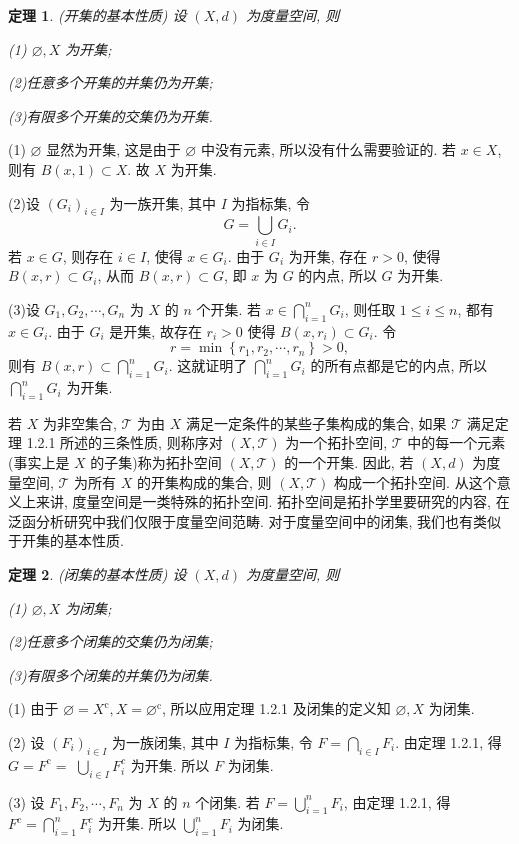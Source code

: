 \documentclass[openany]{ctexbook}
\makeatletter
\theoremstyle{kaiti}
\newtheorem{theorem}{定理}[section]
\theoremstyle{normal}
\renewenvironment{proof}[1][\proofname]{\par
    \pushQED{\qed}%
    \normalfont \topsep6\p@\@plus6\p@\relax
    \trivlist
    \item\relax
    {\heiti #1}\hspace{2\labelsep}\ignorespaces
  }{%
    \popQED\endtrivlist\@endpefalse
  }
\makeatother
\begin{document}
\begin{theorem}
  (开集的基本性质) 设 $(X, d)$ 为度量空间, 则

  (1) $\varnothing, X$ 为开集;

  (2)任意多个开集的并集仍为开集;

  (3)有限多个开集的交集仍为开集.
\end{theorem}

\begin{proof}
(1) $\varnothing$ 显然为开集, 这是由于 $\varnothing$ 中没有元素, 所以没有什么需要验证的. 若 $x \in X$, 则有 $B(x, 1) \subset X$. 故 $X$ 为开集.

(2)设 $\left(G_{i}\right)_{i \in I}$ 为一族开集, 其中 $I$ 为指标集, 令
$$
G=\bigcup_{i \in I} G_{i}.
$$
若 $x \in G$, 则存在 $i \in I$, 使得 $x \in G_{i}$. 由于 $G_{i}$ 为开集, 存在 $r>0$, 使得 $B(x, r) \subset G_{i}$, 从而 $B(x, r) \subset G$, 即 $x$ 为 $G$ 的内点, 所以 $G$ 为开集.

(3)设 $G_1, G_2, \cdots, G_n$ 为 $X$ 的 $n$ 个开集. 若 $x \in \bigcap_{i=1}^n G_{i}$, 则任取 $1 \leqslant i \leqslant n$, 都有 $x \in G_{i}$. 由于 $G_{i}$ 是开集, 故存在 $r_{i}>0$ 使得 $B\left(x, r_{i}\right) \subset G_{i}$. 令
$$
r=\min \left\{r_1, r_2, \cdots, r_n\right\}>0,
$$
则有 $B(x, r) \subset \bigcap_{i=1}^n G_{i}$. 这就证明了 $\bigcap_{i=1}^n G_{i}$ 的所有点都是它的内点, 所以 $\bigcap_{i=1}^n G_{i}$ 为开集.
\end{proof}

若 $X$ 为非空集合, $\mathcal{T}$ 为由 $X$ 满足一定条件的某些子集构成的集合, 如果 $\mathcal{T}$ 满足定理 1.2.1 所述的三条性质, 则称序对 $(X, \mathcal{T})$ 为一个拓扑空间, $\mathcal{T}$ 中的每一个元素 (事实上是 $X$ 的子集)称为拓扑空间 $(X, \mathcal{T})$ 的一个开集. 因此, 若 $(X, d)$ 为度量空间, $\mathcal{T}$ 为所有 $X$ 的开集构成的集合, 则 $(X, \mathcal{T})$ 构成一个拓扑空间. 从这个意义上来讲, 度量空间是一类特殊的拓扑空间. 拓扑空间是拓扑学里要研究的内容, 在泛函分析研究中我们仅限于度量空间范畴. 对于度量空间中的闭集, 我们也有类似于开集的基本性质.

\begin{theorem}
  (闭集的基本性质) 设 $(X, d)$ 为度量空间, 则

  (1) $\varnothing, X$ 为闭集;

  (2)任意多个闭集的交集仍为闭集;

  (3)有限多个闭集的并集仍为闭集.
\end{theorem}

\begin{proof}
(1) 由于 $\varnothing=X^{\mathrm{c}}, X=\varnothing^{\mathrm{c}}$, 所以应用定理 1.2.1 及闭集的定义知 $\varnothing, X$ 为闭集.

(2) 设 $\left(F_{i}\right)_{i \in I}$ 为一族闭集, 其中 $I$ 为指标集, 令 $F=\bigcap_{i \in I} F_{i}$. 由定理 1.2.1, 得 $G=F^{\mathrm{c}}=$ $\bigcup_{i \in I} F_{i}^{c}$ 为开集. 所以 $F$ 为闭集.

(3) 设 $F_1, F_2, \cdots, F_n$ 为 $X$ 的 $n$ 个闭集. 若 $F=\bigcup_{i=1}^n F_{i}$, 由定理 1.2.1, 得 $F^{c}=\bigcap_{i=1}^n F_{i}^{c}$ 为开集. 所以 $\bigcup_{i=1}^n F_{i}$ 为闭集.
\end{proof}
\end{document}
